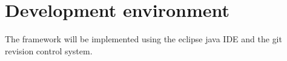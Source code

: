\section{Development environment}

The framework will be implemented using the \Gls{eclipse} \gls{java} \gls{IDE} and the \Gls{git} revision control system.
